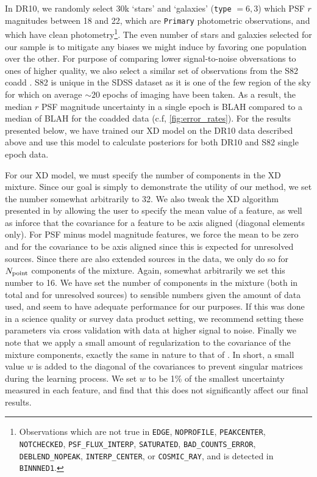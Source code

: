 \documentclass[12pt,preprint]{aastex}
\newcommand\ttt[1]{{\texttt{#1}}}
\begin{document}
In DR10, we randomly select 30k `stars' and `galaxies' (\ttt{type} $= 6, 3$)
which PSF $r$ magnitudes between 18 and 22, which are \ttt{Primary}
photometric observations, and which have clean
photometry\footnote{Observations which are not true in \ttt{EDGE},
\ttt{NOPROFILE}, \ttt{PEAKCENTER}, \ttt{NOTCHECKED}, \ttt{PSF\_FLUX\_INTERP},
\ttt{SATURATED}, \ttt{BAD\_COUNTS\_ERROR}, \ttt{DEBLEND\_NOPEAK},
\ttt{INTERP\_CENTER}, or \ttt{COSMIC\_RAY}, and is detected in
\ttt{BINNNED1}.}.  The even number of stars and galaxies selected for our
sample is to mitigate any biases we might induce by favoring one population
over the other.  For purpose of comparing lower signal-to-noise obversations
to ones of higher quality, we also select a similar set of observations from
the S82 coadd \citep{annis14}.  S82 is unique in the SDSS dataset as it is one
of the few region of the sky for which on average $\sim 20$ epochs of imaging
have been taken.  As a result, the median $r$ PSF magnitude uncertainty in a
single epoch is BLAH compared to a median of BLAH for the coadded data (c.f, 
\ref{fig:error_rates}).  For the results presented below, we have trained our
XD model on the DR10 data described above and use this model to calculate
posteriors for both DR10 and S82 single epoch data.

For our XD model, we must specify the number of components in the XD mixture.
Since our goal is simply to demonstrate the utility of our method, we set the 
number somewhat arbitrarily to 32.  We also tweak the XD algorithm presented in
\citet{bovy09} by allowing the user to specify the mean value of a feature,
as well as inforce that the covariance for a feature to be axis aligned
(diagonal elements only).  For PSF minus model magnitude features, we force
the mean to be zero and for the covariance to be axis aligned since this is
expected for unresolved sources. Since there are also extended sources in the
data, we only do so for $N_{\rm point}$ components of the mixture.  Again,
somewhat arbitrarily we set this number to 16.  We have set the number of
components in the mixture (both in total and for unresolved sources) to
sensible numbers given the amount of data used, and seem to have adequate
performance for our purposes.  If this was done in a science quality or
survey data product setting, we recommend setting these parameters via cross
validation with data at higher signal to noise.  Finally we note that we 
apply a small amount of regularization to the covariance of the mixture
components, exactly the same in nature to that of \citet{bovy10}.  In short, 
a small value $w$ is added to the diagonal of the covariances to prevent
singular matrices during the learning process.  We set $w$ to be 1\% of the 
smallest uncertainty measured in each feature, and find that this does not
significantly affect our final results.
\end{document}
